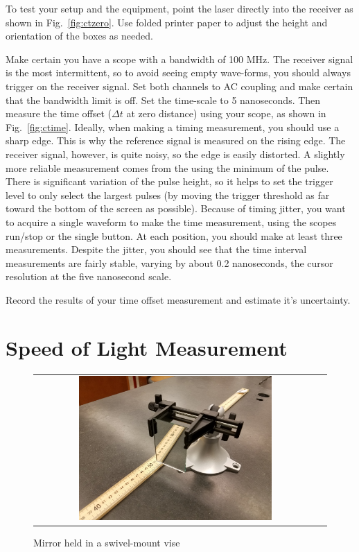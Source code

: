 To test your setup and the equipment, point the laser directly into
the receiver as shown in Fig.~\ref{fig:ctzero}.  Use folded printer
paper to adjust the height and orientation of the boxes as needed.  

Make certain you have a scope with a bandwidth of 100 MHz.  The
receiver signal is the most intermittent, so to avoid seeing empty
wave-forms, you should always trigger on the receiver signal.  Set
both channels to AC coupling and make certain that the bandwidth limit
is off.  Set the time-scale to 5 nanoseconds.  Then measure the time
offset ($\Delta t$ at zero distance) using your scope, as shown in
Fig.~\ref{fig:ctime}.  Ideally, when making a timing measurement, you
should use a sharp edge.  This is why the reference signal is measured
on the rising edge.  The receiver signal, however, is quite noisy, so
the edge is easily distorted.  A slightly more reliable measurement
comes from the using the minimum of the pulse.  There is significant
variation of the pulse height, so it helps to set the trigger level to
only select the largest pulses (by moving the trigger threshold as far
toward the bottom of the screen as possible).  Because of timing
jitter, you want to acquire a single waveform to make the time
measurement, using the scopes run/stop or the single button.  At each
position, you should make at least three measurements.  Despite the
jitter, you should see that the time interval measurements are fairly
stable, varying by about 0.2 nanoseconds, the cursor resolution at the
five nanosecond scale.  
\begin{measurement} Record the results of
your time offset measurement and estimate it's uncertainty. 
\end{measurement}


\section{Speed of Light Measurement}

\begin{figure}[htbp]
\begin{center}
\begin{tabular}{cc}
\includegraphics[width=0.7\textwidth]{figs/labs/c_air/mirror.jpg}
\end{tabular}
\end{center}
\caption{\label{fig:mirror} Mirror held in a swivel-mount vise}
\end{figure}

